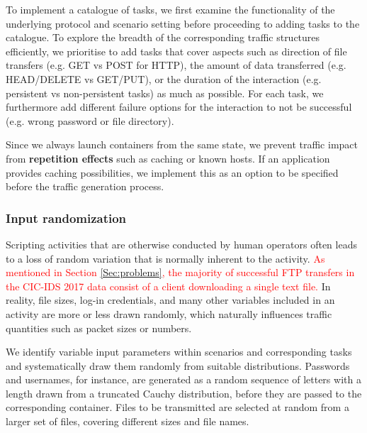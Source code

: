 \documentclass[sigconf]{acmart}
\begin{document}
To implement a catalogue of tasks, we first examine the functionality of the underlying protocol and scenario setting before proceeding to adding tasks to the catalogue. To explore the breadth of the corresponding traffic structures efficiently, we prioritise to add tasks that cover aspects such as direction of file transfers (e.g. GET vs POST for HTTP), the amount of data transferred (e.g. HEAD/DELETE vs GET/PUT), or the duration of the interaction (e.g. persistent vs non-persistent tasks) as much as possible. For each task, we furthermore add different failure options for the interaction to not be successful (e.g. wrong password or file directory). 

Since we always launch containers from the same state, we prevent traffic impact from \textbf{repetition effects} such as caching or known hosts. If an application provides caching possibilities, we implement this as an option to be specified before the traffic generation process.



\subsubsection*{Input randomization}\label{Sec:randomsubscen}

Scripting activities that are otherwise conducted by human operators often leads to a loss of random variation that is normally inherent to the activity.
\textcolor{red}{As mentioned in Section \ref{Sec:problems}, the majority of successful FTP transfers in the CIC-IDS 2017 data consist of a client downloading a single text file.} In reality, file sizes, log-in credentials, and many other variables included in an activity are more or less drawn randomly, which naturally influences traffic quantities such as packet sizes or numbers.

We identify variable input parameters within scenarios and corresponding tasks and systematically draw them randomly from suitable distributions. Passwords and usernames, for instance, are generated as a random sequence of letters with a length drawn from a truncated Cauchy distribution, before they are passed to the corresponding container. Files to be transmitted are selected at random from a larger set of files, covering different sizes and file names.
\end{document}
